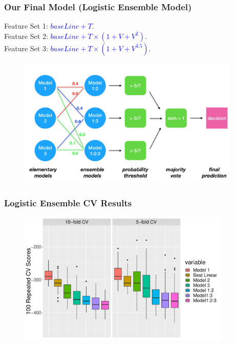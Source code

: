 \documentclass{beamer}
\begin{document}
\begin{frame}
\frametitle{Our Final Model (Logistic Ensemble Model) }

Feature Set 1: \textcolor{blue}{$baseLine + T$}. \\
Feature Set 2: \textcolor{blue}{$baseLine + T \times (1+V+V^2) $}. \\
Feature Set 3: \textcolor{blue}{$baseLine + T \times (1+V+V^{3.5}) $}. \\

\vspace{-0.6em}

	\begin{figure}[H]
		\centering
		\includegraphics[width = 0.95\textwidth]{figure/Ensemble1.png}
	\end{figure}	

\end{frame}








\begin{frame}
\frametitle{Logistic Ensemble CV Results}

	\begin{figure}[H]
		\centering
		\includegraphics[width = 0.9\textwidth]{figure/logis_ens_result.pdf}
	\end{figure}	

\end{frame}
\end{document}
